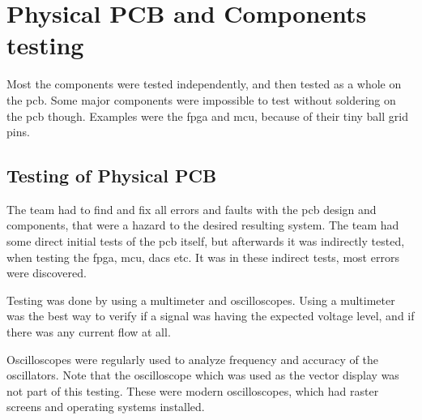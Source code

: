 \section{Physical PCB and Components testing}
Most the components were tested independently, and then tested as a whole on the \gls{pcb}.
Some major components were impossible to test without soldering on the \gls{pcb} though.
Examples were the \gls{fpga} and \gls{mcu}, because of their tiny ball grid pins.

\subsection{Testing of Physical PCB}
The team had to find and fix all errors and faults with the \gls{pcb} design and components, that were a hazard to the desired resulting system.
The team had some direct initial tests of the \gls{pcb} itself,
but afterwards it was indirectly tested, when testing the \gls{fpga}, \gls{mcu}, \gls{dac}s etc.
It was in these indirect tests, most errors were discovered.

Testing was done by using a multimeter and oscilloscopes.
Using a multimeter was the best way to verify if a signal was having the expected voltage level, and if there was any current flow at all.

Oscilloscopes were regularly used to analyze frequency and accuracy of the oscillators.
Note that the oscilloscope which was used as the vector display was not part of this testing.
These were modern oscilloscopes, which had raster screens and operating systems installed.
